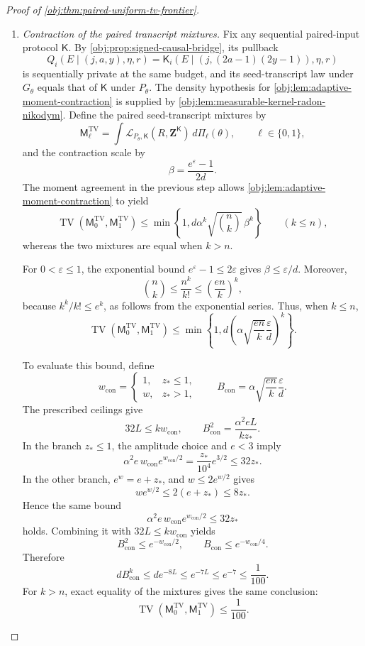 \documentclass[11pt]{article}
\begin{document}
\begin{proof}[Proof of \cref{obj:thm:paired-uniform-tv-frontier}]
\begin{enumerate}
\item \textit{Contraction of the paired transcript mixtures.}
Fix any sequential paired-input protocol \(\mathsf K\).
By \cref{obj:prop:signed-causal-bridge}, its pullback
\[
Q_i(E\mid(j,a,y),\eta,r)
=
\mathsf K_i\!\left(E\mid(j,(2a-1)(2y-1)),\eta,r\right)
\]
is sequentially private at the same budget, and its seed-transcript law under \(G_\theta\) equals that of \(\mathsf K\) under \(P_\theta\).
The density hypothesis for \cref{obj:lem:adaptive-moment-contraction} is supplied by \cref{obj:lem:measurable-kernel-radon-nikodym}.
Define the paired seed-transcript mixtures by
\[
\mathsf M_\ell^{\mathrm{TV}}
=
\int\mathcal L_{P_\theta,\mathsf K}(R,\mathbf Z^{\mathsf K})\,
d\Pi_\ell(\theta),
\qquad \ell\in\{0,1\},
\]
and the contraction scale by
\[
\beta=\frac{e^\varepsilon-1}{2d}.
\]
The moment agreement in the previous step allows \cref{obj:lem:adaptive-moment-contraction} to yield
\[
\operatorname{TV}(\mathsf M_0^{\mathrm{TV}},\mathsf M_1^{\mathrm{TV}})
\le
\min\left\{1,d\alpha^k\sqrt{\binom nk}\,\beta^k\right\}
\qquad(k\le n),
\]
whereas the two mixtures are equal when \(k>n\).

For \(0<\varepsilon\le1\), the exponential bound
\(e^\varepsilon-1\le2\varepsilon\) gives \(\beta\le\varepsilon/d\).
Moreover,
\[
\binom nk\le\frac{n^k}{k!}\le\left(\frac{en}{k}\right)^k,
\]
because \(k^k/k!\le e^k\), as follows from the exponential series.
Thus, when \(k\le n\),
\[
\operatorname{TV}(\mathsf M_0^{\mathrm{TV}},\mathsf M_1^{\mathrm{TV}})
\le
\min\left\{1,
d\left(\alpha\sqrt{\frac{en}{k}}\frac{\varepsilon}{d}\right)^k
\right\}.
\]

To evaluate this bound, define
\[
w_{\mathrm{con}}=
\begin{cases}
1,&z_*\le1,\\
w,&z_*>1,
\end{cases}
\qquad
B_{\mathrm{con}}=\alpha\sqrt{\frac{en}{k}}\frac{\varepsilon}{d}.
\]
The prescribed ceilings give
\[
32L\le k w_{\mathrm{con}},
\qquad
B_{\mathrm{con}}^2=\frac{\alpha^2eL}{kz_*}.
\]
In the branch \(z_*\le1\), the amplitude choice and \(e<3\) imply
\[
\alpha^2e\,w_{\mathrm{con}}e^{w_{\mathrm{con}}/2}
=\frac{z_*}{10^4}e^{3/2}\le32z_*.
\]
In the other branch, \(e^w=e+z_*\), and \(w\le2e^{w/2}\) gives
\[
w e^{w/2}\le2(e+z_*)\le8z_*.
\]
Hence the same bound
\[
\alpha^2e\,w_{\mathrm{con}}e^{w_{\mathrm{con}}/2}\le32z_*
\]
holds. Combining it with \(32L\le kw_{\mathrm{con}}\) yields
\[
B_{\mathrm{con}}^2\le e^{-w_{\mathrm{con}}/2},
\qquad
B_{\mathrm{con}}\le e^{-w_{\mathrm{con}}/4}.
\]
Therefore
\[
d B_{\mathrm{con}}^k
\le d e^{-8L}
\le e^{-7L}
\le e^{-7}\le\frac1{100}.
\]
For \(k>n\), exact equality of the mixtures gives the same conclusion:
\[
\operatorname{TV}(\mathsf M_0^{\mathrm{TV}},\mathsf M_1^{\mathrm{TV}})
\le\frac1{100}.
\]


\end{enumerate}
\end{proof}
\end{document}
